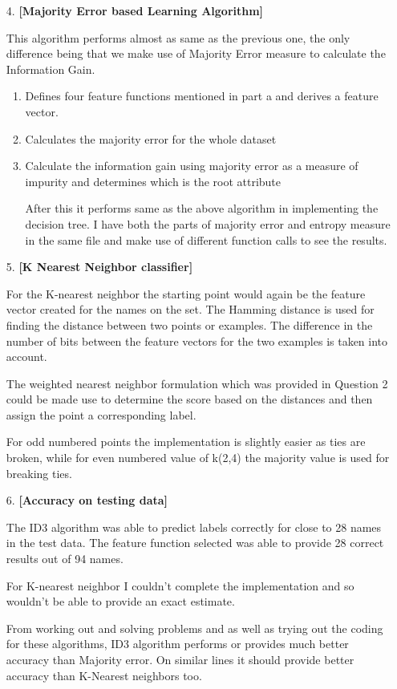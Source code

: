 \documentclass[11pt]{article}
\begin{document}
\begin{enumerate}
\begin{enumerate}
\end{enumerate}

\item[4.] \textbf{[Majority Error based Learning Algorithm]}

This algorithm performs almost as same as the previous one, the only difference being that we make use of Majority Error measure to  calculate the Information Gain.
\begin{enumerate}
	
	\item Defines four feature functions mentioned in part a and derives a feature vector.
	\item Calculates the majority error for the whole dataset
	\item Calculate the information gain using majority error as a measure of impurity and determines which is the root attribute
	
	After this it performs same as the above algorithm in implementing the decision tree. I have both the parts of majority error and entropy measure in the same file and make use of different function calls to see the results.
\end{enumerate}	


\item[5.] \textbf{[K Nearest Neighbor classifier]}

For the K-nearest neighbor the starting point would again be the feature vector created for the names on the set. The Hamming distance is used for finding the distance between two points or examples. The difference in the number of bits between the feature vectors for the two examples is taken into account.

The weighted nearest neighbor formulation which was provided in Question 2 could be made use to determine the score based on the distances and then assign the point a corresponding label.

For odd numbered points the implementation is slightly easier as ties are broken, while for even numbered value of k(2,4) the majority value is used for breaking ties.


\item[6.] \textbf{[Accuracy on testing data]}

The ID3 algorithm was able to predict labels correctly for close to 28 names in the test data. The feature function selected was able to provide 28 correct results out of 94 names.

For K-nearest neighbor I couldn't complete the implementation and so wouldn't be able to provide an exact estimate.

From working out and solving problems and as well as trying out the coding for these algorithms, ID3 algorithm performs or provides much better accuracy than Majority error. On similar lines it should provide better accuracy than K-Nearest neighbors too.

\end{enumerate}
\end{document}
